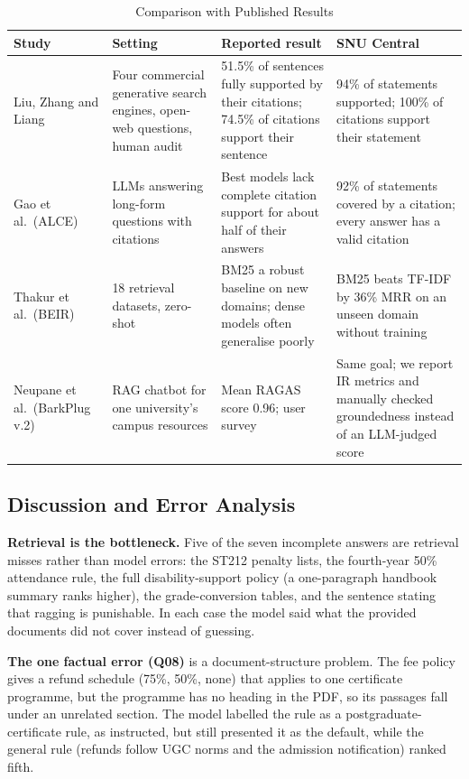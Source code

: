 \documentclass[conference]{IEEEtran}
\begin{document}
\begin{table}[t]
\caption{Comparison with Published Results}
\label{tab:compare}
\centering
\footnotesize
\begin{tabularx}{\textwidth}{@{}L{3.4cm}YYY@{}}
\toprule
\textbf{Study} & \textbf{Setting} & \textbf{Reported result} & \textbf{SNU Central} \\
\midrule
Liu, Zhang and Liang~\cite{liu2023verifiability} & Four commercial generative search engines, open-web questions, human audit & 51.5\% of sentences fully supported by their citations; 74.5\% of citations support their sentence & 94\% of statements supported; 100\% of citations support their statement \\
Gao et al.\ (ALCE)~\cite{gao2023alce} & LLMs answering long-form questions with citations & Best models lack complete citation support for about half of their answers & 92\% of statements covered by a citation; every answer has a valid citation \\
Thakur et al.\ (BEIR)~\cite{thakur2021beir} & 18 retrieval datasets, zero-shot & BM25 a robust baseline on new domains; dense models often generalise poorly & BM25 beats TF-IDF by 36\% MRR on an unseen domain without training \\
Neupane et al.\ (BarkPlug v.2)~\cite{neupane2024barkplug} & RAG chatbot for one university's campus resources & Mean RAGAS score 0.96; user survey & Same goal; we report IR metrics and manually checked groundedness instead of an LLM-judged score \\
\bottomrule
\end{tabularx}
\end{table}

\subsection{Discussion and Error Analysis}\label{sec:discussion}
\textbf{Retrieval is the bottleneck.} Five of the seven incomplete answers are retrieval misses rather than model errors: the ST212 penalty lists, the fourth-year 50\% attendance rule, the full disability-support policy (a one-paragraph handbook summary ranks higher), the grade-conversion tables, and the sentence stating that ragging is punishable. In each case the model said what the provided documents did not cover instead of guessing.

\textbf{The one factual error (Q08)} is a document-structure problem. The fee policy gives a refund schedule (75\%, 50\%, none) that applies to one certificate programme, but the programme has no heading in the PDF, so its passages fall under an unrelated section. The model labelled the rule as a postgraduate-certificate rule, as instructed, but still presented it as the default, while the general rule (refunds follow UGC norms and the admission notification) ranked fifth.
\end{document}
